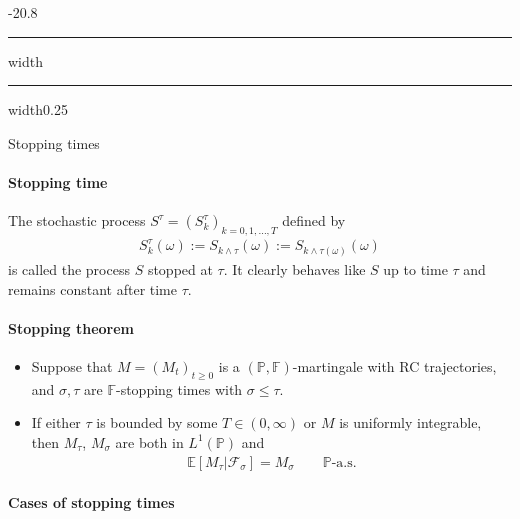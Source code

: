 \documentclass[a4paper,landscape,8pt,fleqn]{scrartcl}
\makeatletter
\renewcommand{\subsection}{\@startsection{subsection}{1}{0mm}%
{-2\baselineskip}{0.8\baselineskip}%
{\hrule depth 0.2pt width\columnwidth\hrule depth0.75pt
width0.25\columnwidth\vspace*{1.2em}\large\bfseries}}
\makeatother
\begin{document}
\begin{multicols*}{3}
\subsection{Stopping times}

\paragraph{Stopping time}

The stochastic process $S^\tau = (S_k^\tau)_{k=0,1, \ldots, T}$ defined by
\begin{align*}
S_k^\tau(\omega) := S_{k \wedge \tau}(\omega) := S_{k \wedge \tau(\omega)}(\omega)
\end{align*}
is called the process $S$ stopped at $\tau$. It clearly behaves like $S$ up to time $\tau$ and remains constant after time $\tau$.

\paragraph{Stopping theorem}

\begin{itemize}
\item Suppose that $M = (M_t)_{t \geq 0}$ is a $(\mathbb{P}, \mathbb{F})$-martingale with RC trajectories, and $\sigma, \tau$ are $\mathbb{F}$-stopping times with $\sigma \leq \tau$.
\item If either $\tau$ is bounded by some $T \in (0, \infty)$  or $M$ is uniformly integrable, then $M_\tau$, $M_\sigma$ are both in $L^1(\mathbb{P})$ and
\begin{align*}
\mathbb{E}[M_\tau | \mathcal{F}_\sigma] = M_\sigma \qquad \mathbb{P} \text{-a.s.}
\end{align*}
\end{itemize}

\paragraph{Cases of stopping times}


\end{multicols*}
\end{document}
